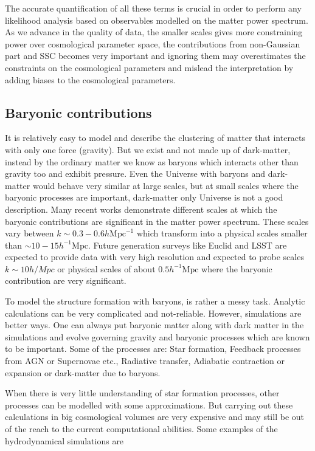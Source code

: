 The accurate quantification of all these terms is crucial in order to perform any
likelihood analysis based on observables modelled on the matter power spectrum. As we
advance in the quality of data, the smaller scales gives more constraining power 
over cosmological parameter space, the contributions from non-Gaussian part and SSC
becomes very important and ignoring them may overestimates the constraints on the 
cosmological parameters and mislead the interpretation by adding biases to the
cosmological parameters.






\subsection{Baryonic contributions}\label{sec:baryons}

It is relatively easy to model and describe the clustering of matter that interacts with only 
one force (gravity). But we exist and not made up of dark-matter, instead by the
ordinary matter we know as baryons which interacts other than gravity too and exhibit pressure. 
Even the Universe with baryons and dark-matter would behave very similar at large scales,
but at small scales where the baryonic processes are important, dark-matter only Universe is
not a good description. Many recent works demonstrate different scales at which the baryonic
contributions are significant in the matter power spectrum. These scales vary between
$k\sim 0.3-0.6 h \mathrm{Mpc}^{-1}$ which transform into a physical scales smaller than
$\sim 10-15 h^{-1} \mathrm{Mpc}$. Future generation surveys like Euclid and LSST are
expected to provide data with very high resolution and expected to probe scales $k \sim 10 h/Mpc$
or physical scales of about $0.5 h^{-1} \mathrm{Mpc}$ where the baryonic contribution 
are very significant.

To model the structure formation with baryons, is rather a messy task. Analytic calculations
can be very complicated and not-reliable. However, simulations are better ways. One can always
put baryonic matter along with dark matter in the simulations and evolve governing gravity and
baryonic processes which are known to be important. Some of the processes are: 
Star formation,
Feedback processes from AGN or Supernovae etc.,
Radiative transfer,
Adiabatic contraction or expansion or dark-matter due to baryons.

When there is very little understanding of star formation processes, other processes can be 
modelled with some approximations. But carrying out these calculations in big cosmological 
volumes are very expensive and may still be out of the reach to the current computational 
abilities. Some examples of the hydrodynamical simulations are \cite{}

